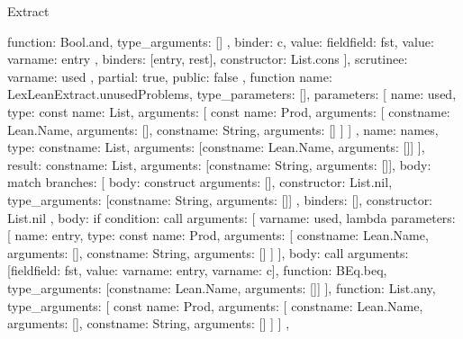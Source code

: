 \begin{lexlean}{Extract}
\begin{toolingmodule}
{{{{{{{                  function: Bool.and,
                  type_arguments: []
                }
              },
              binder: c,
              value: field{field: fst, value: var{name: entry}}
            },
            binders: [entry, rest],
            constructor: List.cons
          }
        ],
        scrutinee: var{name: used}
      },
      partial: true,
      public: false
    },
    function{
      name: LexLeanExtract.unusedProblems,
      type_parameters: [],
      parameters: [
        {
          name: used,
          type: const{
            name: List,
            arguments: [
              const{
                name: Prod,
                arguments: [
                  const{name: Lean.Name, arguments: []},
                  const{name: String, arguments: []}
                ]
              }
            ]
          }
        },
        {name: names, type: const{name: List, arguments: [const{name: Lean.Name, arguments: []}]}}
      ],
      result: const{name: List, arguments: [const{name: String, arguments: []}]},
      body: match{
        branches: [
          {
            body: construct{
              arguments: [],
              constructor: List.nil,
              type_arguments: [const{name: String, arguments: []}]
            },
            binders: [],
            constructor: List.nil
          },
          {
            body: if{
              condition: call{
                arguments: [
                  var{name: used},
                  lambda{
                    parameters: [
                      {
                        name: entry,
                        type: const{
                          name: Prod,
                          arguments: [
                            const{name: Lean.Name, arguments: []},
                            const{name: String, arguments: []}
                          ]
                        }
                      }
                    ],
                    body: call{
                      arguments: [field{field: fst, value: var{name: entry}}, var{name: c}],
                      function: BEq.beq,
                      type_arguments: [const{name: Lean.Name, arguments: []}]
                    }
                  }
                ],
                function: List.any,
                type_arguments: [
                  const{
                    name: Prod,
                    arguments: [
                      const{name: Lean.Name, arguments: []},
                      const{name: String, arguments: []}
                    ]
                  }
                ]
              },
}}}}}
\end{toolingmodule}
\end{lexlean}
